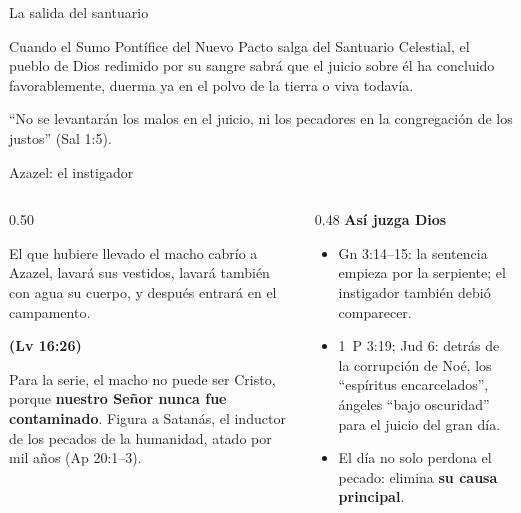 \documentclass[hyperref={bookmarks=false},aspectratio=169]{beamer}
\newcommand{\fuente}[1]{\par\hfill{\upshape\bfseries\footnotesize\textcolor{tierraroja}{#1}}}
\newcommand{\destacar}[1]{\textbf{\textcolor{tierraroja}{#1}}}
\begin{document}
\begin{frame}{La salida del santuario}
\begin{tcolorbox}[colback=papiro,colframe=tierraroja,boxrule=1pt,arc=3pt,fontupper=\small\itshape]
Cuando el Sumo Pontífice del Nuevo Pacto salga del Santuario Celestial, el pueblo de Dios redimido por su sangre sabrá que el juicio sobre él ha concluido favorablemente, duerma ya en el polvo de la tierra o viva todavía.
\end{tcolorbox}
\centering
{}\par
\scriptsize ``No se levantarán los malos en el juicio, ni los pecadores en la congregación de los justos'' (Sal 1:5).
\end{frame}

\begin{frame}{Azazel: el instigador}
\begin{columns}[t,onlytextwidth]
\begin{column}{0.50\textwidth}
\begin{cita}[fontupper=\scriptsize\itshape]El que hubiere llevado el macho cabrío a Azazel, lavará sus vestidos, lavará también con agua su cuerpo, y después entrará en el campamento.\fuente{(Lv 16:26)}\end{cita}
\scriptsize Para la serie, el macho no puede ser Cristo, porque \destacar{nuestro Señor nunca fue contaminado}. Figura a Satanás, el inductor de los pecados de la humanidad, atado por mil años (Ap 20:1--3).
\end{column}
\begin{column}{0.48\textwidth}\scriptsize
\destacar{Así juzga Dios}
\begin{itemize}
\item Gn 3:14--15: la sentencia empieza por la serpiente; el instigador también debió comparecer.
\item 1~P 3:19; Jud 6: detrás de la corrupción de Noé, los ``espíritus encarcelados'', ángeles ``bajo oscuridad'' para el juicio del gran día.
\item El día no solo perdona el pecado: elimina \destacar{su causa principal}.
\end{itemize}
\end{column}
\end{columns}
\end{frame}
\end{document}
